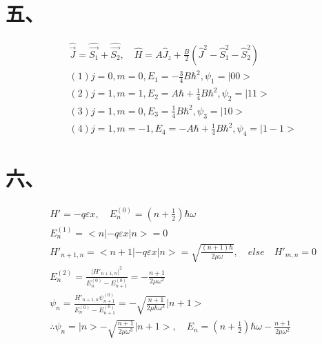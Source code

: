 \documentclass[UTF8]{ctexart}
\begin{document}
\section*{五、}
\begin{equation*}
  \begin{aligned}
     & \hat{\vec J}=\hat{\vec{S_1}}+\hat{\vec{S_2}},\quad\hat H=A\hat J_z+\frac{B}{2}(\hat J^2-\hat S_1^2-\hat S_2^2) \\
     & (1)j=0,m=0,E_1=-\frac{3}{4}B\hbar^2,\psi_1=\lvert00>                                                           \\
     & (2)j=1,m=1,E_2=A\hbar+\frac{1}{4}B\hbar^2,\psi_2=\lvert11>                                                     \\
     & (3)j=1,m=0,E_3=\frac{1}{4}B\hbar^2,\psi_3=\lvert10>                                                            \\
     & (4)j=1,m=-1,E_4=-A\hbar+\frac{1}{4}B\hbar^2,\psi_4=\lvert1-1>
  \end{aligned}
\end{equation*}
\section{六、}
\begin{equation*}
  \begin{aligned}
     & H'=-q\varepsilon x,\quad E_n^{(0)}=(n+\frac{1}{2})\hbar\omega               \\
     & E_n^{(1)}=<n\lvert-q\varepsilon x\rvert n>=0                                \\
     & H'_{n+1,n}=<n+1\lvert-q\varepsilon x\rvert n>
    =\sqrt{\frac{(n+1)\hbar}{2\mu\omega}},\quad else\quad H'_{m,n}=0               \\
     & E_n^{(2)}=\frac{\lvert H'_{n+1,n}\rvert^2}{E_n^{(0)}-E_{n+1}^{(0)}}
    =-\frac{n+1}{2\mu\omega^2}                                                     \\
     & \psi_n=\frac{H'_{n+1,n}\psi_{n+1}^{(0)}}{E_n^{(0)}-E_{n+1}^{(0)}}
    =-\sqrt{\frac{n+1}{2\mu\hbar\omega^3}}\lvert n+1>                              \\
     & \therefore\psi_n=\lvert n>-\sqrt{\frac{n+1}{2\mu\omega^3}}\lvert n+1>,\quad
    E_n=(n+\frac{1}{2})\hbar\omega-\frac{n+1}{2\mu\omega^2}
  \end{aligned}
\end{equation*}
\end{document}
